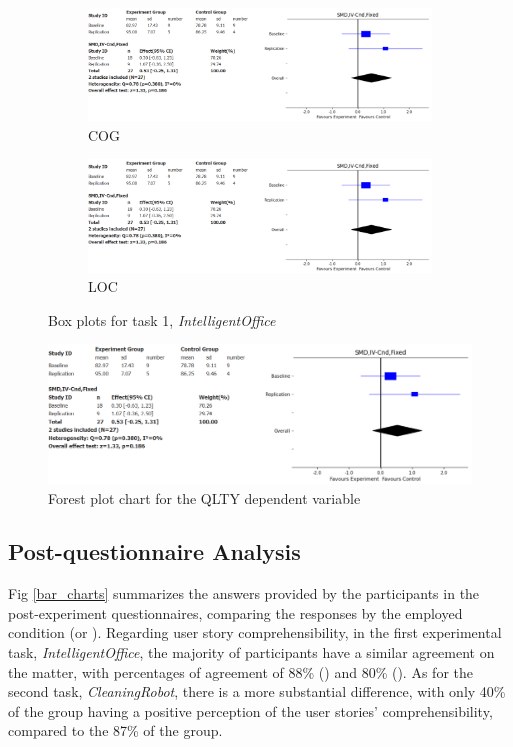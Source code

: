 \begin{figure}[htbp]
    \medskip

    \begin{subfigure}{0.5\textwidth}
        \includegraphics[width=\linewidth]{figures/forest_plots/QLTY.png}
        \caption{COG}
        \label{fp5}
    \end{subfigure}\hfil
    \begin{subfigure}{0.5\textwidth}
        \includegraphics[width=\linewidth]{figures/forest_plots/QLTY.png}
        \caption{LOC}
        \label{fp6}
    \end{subfigure}
    \caption{Box plots for task 1, \textit{IntelligentOffice}}
    \label{fpx}
\end{figure}

\begin{figure}[H]
    \centering
    \includegraphics[width=\linewidth]{figures/forest_plots/QLTY.png}
    \caption{Forest plot chart for the QLTY dependent variable}
    \label{forest_plot}
\end{figure}



\subsection{Post-questionnaire Analysis}
Fig \ref{bar_charts} summarizes the answers provided by the participants in the post-experiment questionnaires, comparing the responses by the employed condition (\tdd or \notdd).
Regarding user story comprehensibility, in the first experimental task, \textit{IntelligentOffice}, the majority of participants have a similar agreement on the matter, with percentages of agreement of 88\% (\tdd) and 80\% (\notdd). As for the second task, \textit{CleaningRobot}, there is a more substantial difference, with only 40\% of the \tdd group having a positive perception of the user stories' comprehensibility, compared to the 87\% of the \notdd group.

